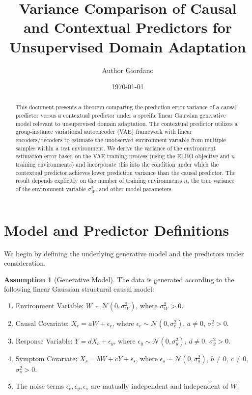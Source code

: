 \documentclass{article}
\title{Variance Comparison of Causal and Contextual Predictors for Unsupervised Domain Adaptation}
\author{Author Giordano}
\date{\today}
\theoremstyle{plain}
\theoremstyle{definition}
\newtheorem{assumption}{Assumption}[section]
\theoremstyle{remark}
\newcommand{\N}{\mathcal{N}} %
\begin{document}
\maketitle

\begin{abstract}
This document presents a theorem comparing the prediction error variance of a causal predictor versus a contextual predictor under a specific linear Gaussian generative model relevant to unsupervised domain adaptation. The contextual predictor utilizes a group-instance variational autoencoder (VAE) framework with linear encoders/decoders to estimate the unobserved environment variable from multiple samples within a test environment. We derive the variance of the environment estimation error based on the VAE training process (using the ELBO objective and $n$ training environments) and incorporate this into the condition under which the contextual predictor achieves lower prediction variance than the causal predictor. The result depends explicitly on the number of training environments $n$, the true variance of the environment variable $\sigma_W^2$, and other model parameters.
\end{abstract}

\section{Model and Predictor Definitions}

We begin by defining the underlying generative model and the predictors under consideration.

\begin{assumption}[Generative Model]\label{ass:model}
The data is generated according to the following linear Gaussian structural causal model:
\begin{enumerate}
    \item Environment Variable: $W \sim \N(0, \sigma_W^2)$, where $\sigma_W^2 > 0$.
    \item Causal Covariate: $X_c = aW + \epsilon_c$, where $\epsilon_c \sim \N(0, \sigma_c^2)$, $a \neq 0$, $\sigma_c^2 > 0$.
    \item Response Variable: $Y = dX_c + \epsilon_y$, where $\epsilon_y \sim \N(0, \sigma_y^2)$, $d \neq 0$, $\sigma_y^2 > 0$.
    \item Symptom Covariate: $X_s = bW + cY + \epsilon_s$, where $\epsilon_s \sim \N(0, \sigma_s^2)$, $b \neq 0$, $c \neq 0$, $\sigma_s^2 > 0$.
    \item The noise terms $\epsilon_c, \epsilon_y, \epsilon_s$ are mutually independent and independent of $W$.
\end{enumerate}
\end{assumption}
\end{document}

